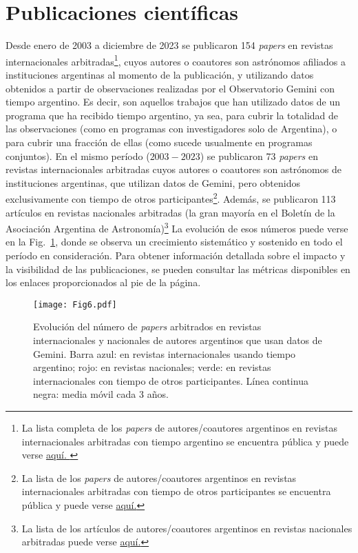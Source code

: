 \documentclass[baaa]{baaa}
\begin{document}
\section{Publicaciones científicas}
Desde enero de 2003 a diciembre de 2023 se publicaron 154 {\em papers} en revistas internacionales arbitradas\footnote{La lista completa de los {\em papers} de autores/coautores argentinos en revistas internacionales arbitradas con tiempo argentino se encuentra pública y puede verse \href{https://ui.adsabs.harvard.edu/public-libraries/1hdbb9McRs2FJZUYCTmQoA}{aquí. }}, cuyos autores o coautores son astrónomos afiliados a instituciones argentinas al momento de la publicación, y utilizando datos obtenidos a partir de observaciones realizadas por el Observatorio Gemini con tiempo argentino. 
Es decir, son aquellos trabajos que han utilizado datos de un programa que ha recibido tiempo argentino, ya sea, para cubrir la totalidad de las observaciones (como en programas con investigadores solo de Argentina), o para cubrir una fracción de ellas (como sucede usualmente en programas conjuntos).
En el mismo período ($2003 - 2023$) se publicaron 73 {\em papers} en revistas internacionales arbitradas cuyos autores o coautores son astrónomos de instituciones argentinas, que utilizan datos de Gemini, pero obtenidos exclusivamente con tiempo de otros participantes\footnote{La lista de los {\em papers} de autores/coautores argentinos en revistas internacionales arbitradas con tiempo de otros participantes se encuentra pública y puede verse \href{https://ui.adsabs.harvard.edu/public-libraries/tYie4xXUQqCFJJxdKS0WhA}{aquí.}}. 
Además, se publicaron 113 artículos en revistas nacionales arbitradas (la gran mayoría en el Boletín de la Asociación Argentina de Astronomía)\footnote{La lista de los artículos de autores/coautores argentinos en revistas nacionales arbitradas puede verse \href{https://ui.adsabs.harvard.edu/public-libraries/tU0zGpSITByvqTMal7qrVw}{aquí.}}
La evolución de esos números puede verse en la Fig.~\ref{fig6}, donde se observa un crecimiento sistemático y sostenido en todo el período en consideración. 
Para obtener información detallada sobre el impacto y la visibilidad de las publicaciones, se pueden consultar las métricas disponibles en los enlaces proporcionados al pie de la página.
\\

\begin{figure}[!t]
\centering
\texttt{[image: Fig6.pdf]}
\caption{Evolución del número de {\em papers} arbitrados en revistas internacionales y nacionales de autores argentinos que usan datos de Gemini. Barra azul: en revistas internacionales usando tiempo argentino; rojo: en revistas nacionales; verde: en revistas internacionales con tiempo de otros participantes. Línea continua negra: media móvil cada 3 años.}
\label{fig6}
\end{figure}
\end{document}
